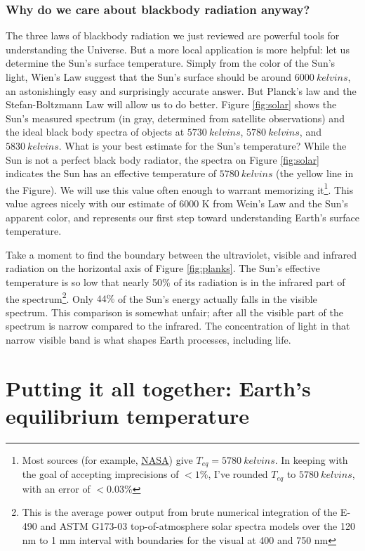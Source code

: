 \subsubsection{Why do we care about blackbody radiation anyway?}
The three laws of blackbody radiation we just reviewed are powerful tools for understanding the Universe. But a more local application is more helpful: let us determine the Sun's surface temperature. Simply from the color of the Sun's light, Wien's Law suggest that the Sun's surface should be around $\SI{6000}{kelvins}$, an astonishingly easy and surprisingly accurate answer. But Planck's law and the Stefan-Boltzmann Law will allow us to do better. Figure \ref{fig:solar} shows the Sun's measured spectrum (in gray, determined from satellite observations) and the ideal black body spectra of objects at $\SI{5730}{kelvins}$, $\SI{5780}{kelvins}$, and $\SI{5830}{kelvins}$. What is your best estimate for the Sun's temperature? While the Sun is not a perfect black body radiator, the spectra on Figure \ref{fig:solar} indicates the Sun has an effective temperature of $\SI{5780}{kelvins}$ (the yellow line in the Figure). We will use this value often enough to warrant memorizing it\footnote{Most sources (for example, \href{http://nssdc.gsfc.nasa.gov/planetary/factsheet/sunfact.html}{NASA}) give $T_{eq}=\SI{5780}{kelvins}$. In keeping with the goal of accepting imprecisions of $< 1\%$, I've rounded $T_{eq}$ to $\SI{5780}{kelvins}$, with an error of $< 0.03\%$ }. This value agrees nicely with our estimate of 6000 K from Wein's Law and the Sun's apparent color, and represents our first step toward understanding Earth's surface temperature.

Take a moment to find the boundary between the ultraviolet, visible and infrared radiation on the horizontal axis of Figure \ref{fig:planks}. The Sun's effective temperature is so low that nearly 50\% of its radiation is in the infrared part of the spectrum\footnote{This is the average power output from brute numerical integration of the E-490 and ASTM G173-03 top-of-atmosphere solar spectra models over the 120 nm to 1 mm interval with boundaries for the visual at 400 and 750 nm}. Only $44\%$ of the Sun's energy actually falls in the visible spectrum. This comparison is somewhat unfair; after all the visible part of the spectrum is narrow compared to the infrared. The concentration of light in that narrow visible band is what shapes Earth processes, including life.

\section{Putting it all together: Earth's equilibrium temperature} \label{Earth's Equilibrium Temperature}
